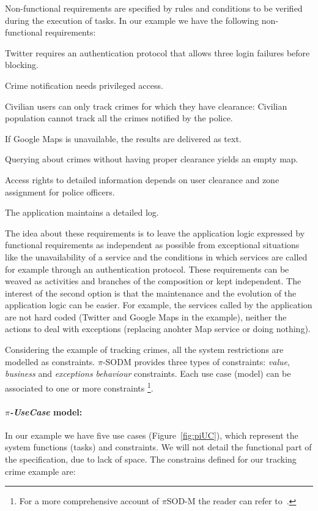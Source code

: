 Non-functional requirements are specified by rules and conditions to be verified during the execution of tasks.
In our example we have the following non-functional requirements:
\begin{numtrivlist}
\item Twitter requires  an authentication protocol that allows three login failures before blocking. 
\item Crime notification needs privileged access.
\item Civilian users can only track crimes for which they have clearance: Civilian population cannot track all the crimes notified by the police. 
\item If \textsf{Google Maps} is unavailable, the results are delivered as text. 
\item Querying about crimes without having proper clearance yields an empty map.
\item Access rights to detailed information depends on user clearance and zone assignment for police officers. 
\item The application maintains a detailed log. 
\end{numtrivlist}
The idea about these requirements is to leave the application logic expressed by functional requirements as independent as possible from exceptional situations like the unavailability of a service and the conditions in which services are called for example through an authentication protocol. These requirements can be  weaved as activities and branches of the composition or kept independent. The interest of the second option is that the maintenance and the evolution of the application logic can be easier. For example, the services called by the application are not hard coded (Twitter and Google Maps in the example), neither the actions to deal with exceptions (replacing anohter Map service or doing nothing).

Considering the example of tracking crimes, all the system restrictions are
modelled as constraints. 
$\pi$-SODM provides three types of constraints:
\textit{value}, \textit{business} and \textit{exceptions behaviour} constraints.
Each use case (model) can be associated to one or more constraints \footnote{For a more comprehensive account of $\pi$SOD-M the reader can refer to~\cite{PlacidoThesis2012}.}.

\paragraph*{\textit{$\pi$-UseCase} model:} 
In our example we have five use cases (Figure~\ref{fig:piUC}), which represent the
system functions (tasks) and constraints. 
We will not detail the functional part of the specification, due to lack of space.
The constrains defined for our tracking crime example are: 

